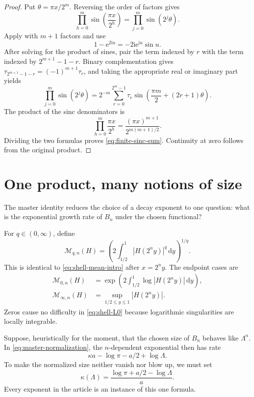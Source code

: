 \documentclass[11pt,oneside]{article}
\numberwithin{equation}{section}
\theoremstyle{definition}
\theoremstyle{remark}
\newcommand{\e}{\mathrm e}
\newcommand{\ii}{\mathrm i}
\newcommand{\dd}{\,\mathrm d}
\newcommand{\abs}[1]{\left|#1\right|}
\newcommand{\TM}{\tau}
\begin{document}
\begin{proof}
Put \(\theta=\pi x/2^m\).  Reversing the order of factors gives
\[
 \prod_{h=0}^{m}\sin\!\left(\frac{\pi x}{2^h}\right)
 =\prod_{j=0}^{m}\sin(2^j\theta).
\]
Apply  with \(m+1\) factors and use
\[
 1-\e^{2\ii u}=-2\ii\e^{\ii u}\sin u.
\]
After solving for the product of sines, pair the term indexed by \(r\) with the term indexed
by \(2^{m+1}-1-r\).  Binary complementation gives
\(
 \TM_{2^{m+1}-1-r}=(-1)^{m+1}\TM_r
\), and taking the appropriate real or imaginary part yields
\[
 \prod_{j=0}^{m}\sin(2^j\theta)
 =2^{-m}\sum_{r=0}^{2^m-1}\TM_r
   \sin\!\left(\frac{\pi m}{2}+(2r+1)\theta\right).
\]
The product of the sinc denominators is
\[
 \prod_{h=0}^{m}\frac{\pi x}{2^h}
 =\frac{(\pi x)^{m+1}}{2^{m(m+1)/2}}.
\]
Dividing the two formulas proves \eqref{eq:finite-sinc-sum}.  Continuity at zero follows
from the original product.
\end{proof}

\section{One product, many notions of size}
\label{sec:spectrum-overview}

The master identity reduces the choice of a decay exponent to one question: what is the
exponential growth rate of \(B_n\) under the chosen functional?

For \(q\in(0,\infty)\), define
\begin{equation}
 \mathcal M_{q,n}(H)
 =\left(2\int_{1/2}^{1}\abs{H(2^ny)}^q\dd y\right)^{1/q}.
 \label{eq:shell-Lq}
\end{equation}
This is identical to \eqref{eq:shell-mean-intro} after \(x=2^ny\).  The endpoint cases are
\begin{align}
 \mathcal M_{0,n}(H)
 &=\exp\!\left(2\int_{1/2}^{1}\log\abs{H(2^ny)}\dd y\right),
 \label{eq:shell-L0}\\
 \mathcal M_{\infty,n}(H)
 &=\sup_{1/2\le y\le1}\abs{H(2^ny)}.
 \label{eq:shell-Linf}
\end{align}
Zeros cause no difficulty in \eqref{eq:shell-L0} because logarithmic singularities are
locally integrable.

Suppose, heuristically for the moment, that the chosen size of \(B_n\) behaves like
\(\Lambda^n\).  In \eqref{eq:master-normalization}, the \(n\)-dependent exponential then
has rate
\[
 \kappa a-\log\pi-a/2+\log\Lambda.
\]
To make the normalized size neither vanish nor blow up, we must set
\begin{equation}
 \boxed{
 \kappa(\Lambda)=\frac{\log\pi+a/2-\log\Lambda}{a}.}
 \label{eq:kappa-from-Lambda}
\end{equation}
Every exponent in the article is an instance of this one formula.
\end{document}
